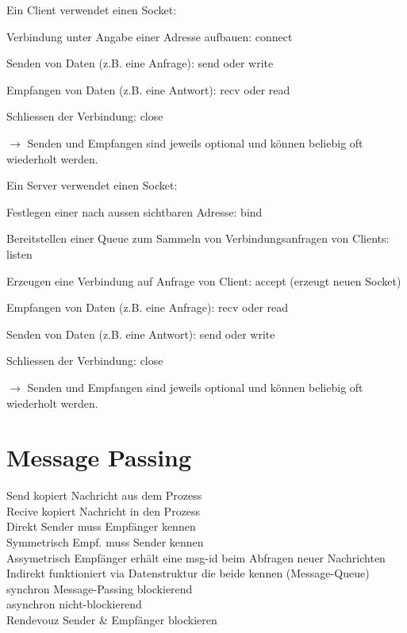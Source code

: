 \begin{multicols*}{5}
Ein \textcolor{h}{Client verwendet einen Socket}:
\begin{compactenum}[1.]
	\item Verbindung unter Angabe einer Adresse aufbauen: connect
	\item Senden von Daten (z.B. eine Anfrage): send oder write
	\item Empfangen von Daten (z.B. eine Antwort): recv oder read
	\item Schliessen der Verbindung: close
\end{compactenum}

	$\rightarrow$ Senden und Empfangen sind jeweils optional und können beliebig oft wiederholt werden.

Ein \textcolor{h}{Server verwendet einen Socket}:
\begin{compactenum}[1.]
	\item Festlegen einer nach aussen sichtbaren Adresse: bind
	\item Bereitstellen einer Queue zum Sammeln von Verbindungsanfragen von Clients: listen 
	\item Erzeugen eine Verbindung auf Anfrage von Client: accept (erzeugt neuen Socket) 
	\item Empfangen von Daten (z.B. eine Anfrage): recv oder read 
	\item Senden von Daten (z.B. eine Antwort): send oder write 
	\item Schliessen der Verbindung: close
\end{compactenum}
	$\rightarrow$	Senden und Empfangen sind jeweils optional und können beliebig oft wiederholt werden.



\section{Message Passing}

\textcolor{h}{Send} kopiert Nachricht aus dem Prozess\\
\textcolor{h}{Recive} kopiert Nachricht in den Prozess\\
\textcolor{h}{Direkt} Sender muss Empfänger kennen\\
\textcolor{h}{Symmetrisch} Empf. muss Sender kennen\\
\textcolor{h}{Assymetrisch} Empfänger erhält eine msg-id beim Abfragen neuer Nachrichten\\
\textcolor{h}{Indirekt} funktioniert via Datenstruktur die beide kennen (Message-Queue)\\
\textcolor{h}{synchron} Message-Passing blockierend\\
\textcolor{h}{asynchron} nicht-blockierend \\
\textcolor{h}{Rendevouz} Sender \& Empfänger blockieren


\end{multicols*}
